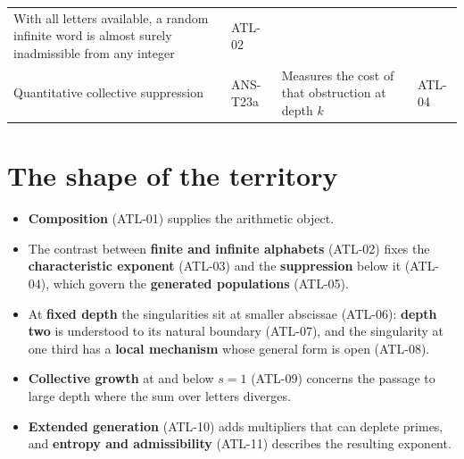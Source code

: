 \documentclass[
  11pt,
]{article}
\providecommand{\tightlist}{%
  \setlength{\itemsep}{0pt}\setlength{\parskip}{0pt}}
\begin{document}
\begin{longtable}[]{@{}llll@{}}
\begin{minipage}[t]{0.41\columnwidth}
With all letters available, a random infinite word is almost surely
inadmissible from any integer\strut
\end{minipage} & \begin{minipage}[t]{0.11\columnwidth}\raggedright
ATL-02\strut
\end{minipage}\tabularnewline
\begin{minipage}[t]{0.23\columnwidth}\raggedright
Quantitative collective suppression\strut
\end{minipage} & \begin{minipage}[t]{0.13\columnwidth}\raggedright
ANS-T23a\strut
\end{minipage} & \begin{minipage}[t]{0.41\columnwidth}\raggedright
Measures the cost of that obstruction at depth \(k\)\strut
\end{minipage} & \begin{minipage}[t]{0.11\columnwidth}\raggedright
ATL-04\strut
\end{minipage}\tabularnewline
\bottomrule
\end{longtable}

\hypertarget{the-shape-of-the-territory}{%
\section{The shape of the territory}\label{the-shape-of-the-territory}}

\begin{itemize}
\tightlist
\item
  \textbf{Composition} (ATL-01) supplies the arithmetic object.
\item
  The contrast between \textbf{finite and infinite alphabets} (ATL-02)
  fixes the \textbf{characteristic exponent} (ATL-03) and the
  \textbf{suppression} below it (ATL-04), which govern the
  \textbf{generated populations} (ATL-05).
\item
  At \textbf{fixed depth} the singularities sit at smaller abscissae
  (ATL-06): \textbf{depth two} is understood to its natural boundary
  (ATL-07), and the singularity at one third has a \textbf{local
  mechanism} whose general form is open (ATL-08).
\item
  \textbf{Collective growth} at and below \(s=1\) (ATL-09) concerns the
  passage to large depth where the sum over letters diverges.
\item
  \textbf{Extended generation} (ATL-10) adds multipliers that can
  deplete primes, and \textbf{entropy and admissibility} (ATL-11)
  describes the resulting exponent.
\end{itemize}
\end{document}
